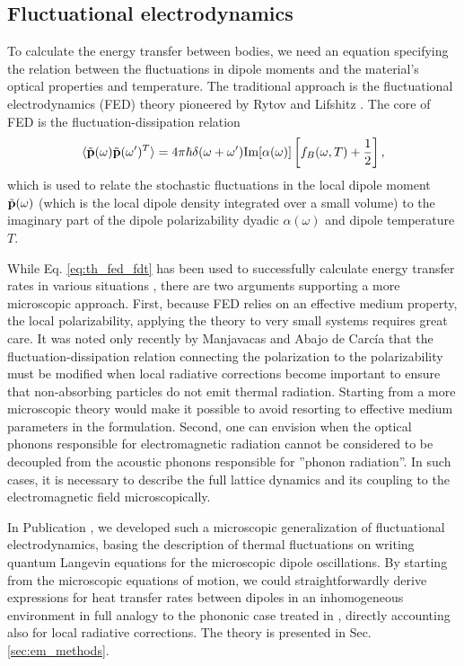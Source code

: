\subsection{Fluctuational electrodynamics}

To calculate the energy transfer between bodies, we need an equation specifying the relation between the fluctuations in dipole moments and the material's optical properties and temperature. The traditional approach is the fluctuational electrodynamics (FED) theory pioneered by Rytov \cite{rytov} and Lifshitz \cite{lifshitz55}. The core of FED is the fluctuation-dissipation relation \cite{novotny,agarwal75_1}
\begin{equation}
 \langle \tilde{\mathbf{p}}(\omega)\tilde{\mathbf{p}}(\omega')^T\rangle = 4\pi \hbar \delta(\omega+\omega')  \textrm{Im}[\alpha(\omega)] \left[f_B(\omega,T)+\frac{1}{2} \right], \label{eq:th_fed_fdt}
\end{equation}
which is used to relate the stochastic fluctuations in the local dipole moment $\tilde{\mathbf{p}}(\omega)$ (which is the local dipole density integrated over a small volume) to the imaginary part of the dipole polarizability dyadic $\alpha(\omega)$ and dipole temperature $T$. 

While Eq. \eqref{eq:th_fed_fdt} has been used to successfully calculate energy transfer rates in various situations \cite{}, there are two arguments supporting a more microscopic approach. First, because FED relies on an effective medium property, the local polarizability, applying the theory to very small systems requires great care. It was noted only recently by Manjavacas and Abajo de Carc\'ia \cite{manjavacas12} that the fluctuation-dissipation relation connecting the polarization to the polarizability must be modified when local radiative corrections become important to ensure that non-absorbing particles do not emit thermal radiation. Starting from a more microscopic theory would make it possible to avoid resorting to effective medium parameters in the formulation. Second, one can envision  when the optical phonons responsible for electromagnetic radiation cannot be considered to be decoupled from the acoustic phonons responsible for ''phonon radiation''. In such cases, it is necessary to describe the full lattice dynamics and its coupling to the electromagnetic field microscopically. 

In Publication , we developed such a microscopic generalization of fluctuational electrodynamics, basing the description of thermal fluctuations on writing quantum Langevin equations for the microscopic dipole oscillations. By starting from the microscopic equations of motion, we could straightforwardly derive expressions for heat transfer rates between dipoles in an inhomogeneous environment in full analogy to the phononic case treated in , directly accounting also for local radiative corrections. The theory is presented in Sec. \ref{sec:em_methods}.


